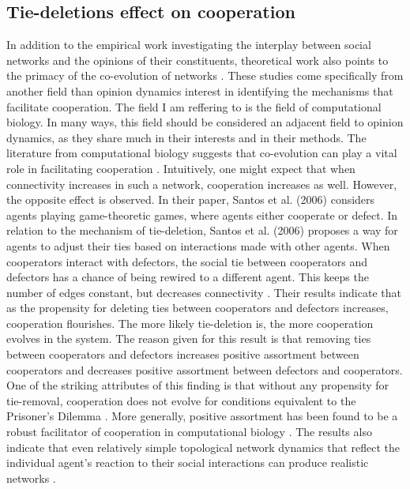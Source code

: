 \documentclass{article}
\begin{document}
\subsection{Tie-deletions effect on cooperation}
In addition to the empirical work investigating the interplay between social networks and the opinions of their constituents, theoretical work also points to the primacy of the co-evolution of networks \cite{holme_nonequilibrium_2006}. 
These studies come specifically from another field than opinion dynamics interest in identifying the mechanisms that facilitate cooperation. The field I am reffering to is the field of computational biology. In many ways, this field should be considered an adjacent field to opinion dynamics, as they share much in their interests and in their methods. The literature from computational biology suggests that co-evolution can play a vital role in facilitating cooperation \cite{dakin_dynamic_2018,melamed_strong_2016,pepper_mechanism_2002,santos_cooperation_2006}. Intuitively, one might expect that when connectivity increases in such a network, cooperation increases as well. However, the opposite effect is observed. In their paper, Santos et al. (2006) considers agents playing game-theoretic games, where agents either cooperate or defect. In relation to the mechanism of tie-deletion, Santos et al. (2006) proposes a way for agents to adjust their ties based on interactions made with other agents. When cooperators interact with defectors, the social tie between cooperators and defectors has a chance of being rewired to a different agent. This keeps the number of edges constant, but decreases connectivity \cite{santos_cooperation_2006}. Their results indicate that as the propensity for deleting ties between cooperators and defectors increases, cooperation flourishes. The more likely tie-deletion is, the more cooperation evolves in the system. The reason given for this result is that removing ties between cooperators and defectors increases positive assortment between cooperators and decreases positive assortment between defectors and cooperators. One of the striking attributes of this finding is that without any propensity for tie-removal, cooperation does not evolve for conditions equivalent to the Prisoner’s Dilemma \cite{santos_cooperation_2006}. More generally, positive assortment has been found to be a robust facilitator of cooperation in computational biology \cite{boyd_coordinated_2010,dakin_dynamic_2018,melamed_strong_2016,pepper_mechanism_2002}. The results also indicate that even relatively simple topological network dynamics that reflect the individual agent’s reaction to their social interactions can produce realistic networks \cite{santos_cooperation_2006}. 
\end{document}

